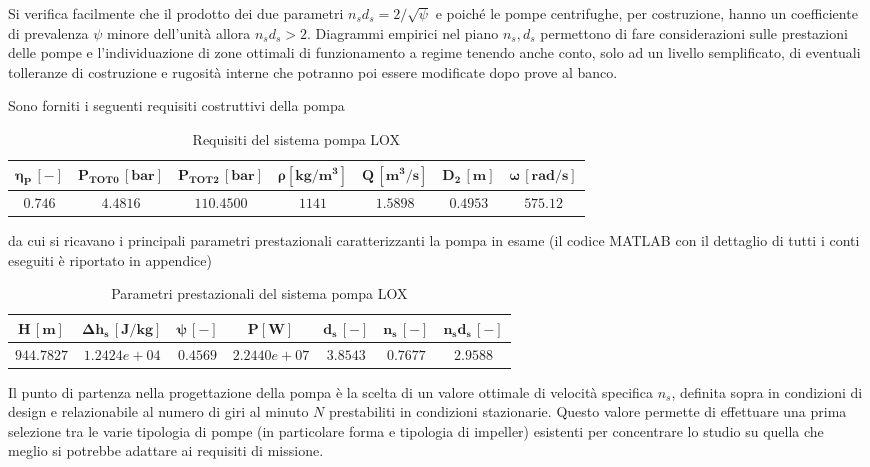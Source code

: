 Si verifica facilmente che il prodotto dei due parametri $n_s d_s = {2}/{\sqrt\psi}$  e poiché le pompe centrifughe, per costruzione, hanno un coefficiente di prevalenza $\psi$ minore dell’unità allora $n_s d_s > 2$. Diagrammi empirici nel piano $n_s, d_s$ permettono di fare considerazioni sulle prestazioni delle pompe e l’individuazione di zone ottimali di funzionamento a regime tenendo anche conto, solo ad un livello semplificato, di eventuali tolleranze di costruzione e rugosità interne che potranno poi essere modificate dopo prove al banco.

Sono forniti i seguenti requisiti costruttivi della pompa \cite{turbopump_manual}
\begin{table}[H]
\centering
\begin{tabular}{|c|c|c|c|c|c|c|}
\hline
$\bm{\eta_P \, [-]}$ & $\bm{P_ {TOT0} \, [bar]}$ & $\bm{P_{TOT2} \, [bar]}$ & $\bm{\rho [kg/m^3]}$ & $\bm{Q \, [m^3/s]}$ & $\bm{D_2 \, [m]}$ & $\bm{\omega \, [rad/s]}$  \\
\hline
$0.746$ & $4.4816$ & $110.4500$ &  $1141$ & $1.5898$ & $0.4953$ & $575.12$  \\
\hline
\end{tabular}

\caption{Requisiti del sistema pompa LOX}
\label{table:LOX pump specs}

\end{table}

da cui si ricavano i principali parametri prestazionali caratterizzanti la pompa in esame (il codice MATLAB con il dettaglio di tutti i conti eseguiti è riportato in appendice)

\begin{table}[H]
\centering
\begin{tabular}{|c|c|c|c|c|c|c|}
\hline
$\bm{H \, [m]}$ & $\bm{\Delta h_s \, [J/kg]}$ & $\bm{\psi \, [-]}$ & $\bm{P [W]}$ & $\bm{d_s \, [-]}$ & $\bm{n_s \, [-]}$ & $\bm{n_s d_s \, [-]}$  \\
\hline
$944.7827$ & $1.2424e+04$ & $0.4569$ &  $2.2440e+07$ & $3.8543$ & $0.7677$ & $2.9588$  \\
\hline
\end{tabular}

\caption{Parametri prestazionali del sistema pompa LOX}
\label{table:LOX pump performance}

\end{table}

Il punto di partenza nella progettazione della pompa è la scelta di un valore ottimale di velocità specifica $n_s$, definita sopra in condizioni di design e relazionabile al numero di giri al minuto $N$ prestabiliti in condizioni stazionarie. Questo valore permette di effettuare una prima selezione tra le varie tipologia di pompe (in particolare forma e tipologia di impeller) esistenti per concentrare lo studio su quella che meglio si potrebbe adattare ai requisiti di missione.
 \\

